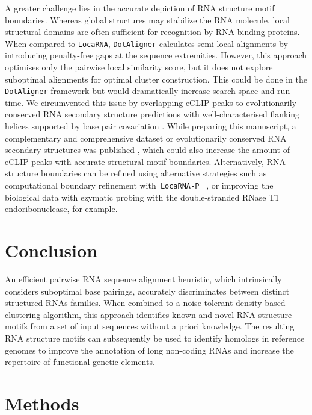 \documentclass{bmcart}
\newcommand\dotaligner{\texttt{DotAligner}}
\newcommand\locarna{\texttt{LocaRNA}}
\begin{document}
A greater challenge lies in the accurate depiction of RNA structure motif boundaries. 
Whereas global structures may stabilize the RNA molecule, local
structural domains are often sufficient for recognition by RNA binding
proteins. When compared to \locarna{}, \dotaligner{} calculates semi-local
alignments by introducing penalty-free gaps at the sequence extremities. 
However, this approach optimises only the pairwise local similarity score, but it does
not explore suboptimal alignments for optimal cluster construction. This could
be done in the \dotaligner{} framework but would dramatically increase search
space and run-time. We circumvented this issue by overlapping eCLIP peaks to 
evolutionarily conserved RNA secondary structure predictions with well-characterised
flanking helices supported by base pair covariation \cite{smith2013widespread}.
While preparing this manuscript, a complementary and comprehensive dataset 
or evolutionarily conserved RNA secondary structures was published \cite{seemann2017identification}, which 
could also increase the amount of eCLIP peaks with accurate structural motif boundaries. 
Alternatively, RNA structure boundaries can be refined 
using alternative strategies such as computational boundary refinement 
with\texttt{ LocaRNA-P } \cite{will2012locarna}, or improving the biological 
data with ezymatic probing with the double-stranded RNase T1 
endoribonuclease, for example. \\

\section*{Conclusion}
An efficient pairwise RNA sequence alignment heuristic, which intrinsically considers
suboptimal base pairings, accurately discriminates between distinct structured RNAs families.
When combined to a noise tolerant density based clustering algorithm, this 
approach identifies known and novel RNA structure motifs from a set of input sequences 
without a priori knowledge. The resulting RNA structure motifs can subsequently 
be used to identify homologs in reference genomes to improve the annotation of 
long non-coding RNAs and increase the repertoire of functional genetic elements. 


\section*{Methods}
\end{document}
